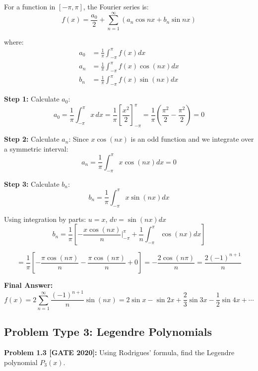 \documentclass[12pt,a4paper]{article}
\begin{document}
\begin{solution}
For a function in $[-\pi, \pi]$, the Fourier series is:
$$f(x) = \frac{a_0}{2} + \sum_{n=1}^{\infty} (a_n \cos nx + b_n \sin nx)$$

where:
\begin{align*}
a_0 &= \frac{1}{\pi}\int_{-\pi}^{\pi} f(x)dx \\
a_n &= \frac{1}{\pi}\int_{-\pi}^{\pi} f(x)\cos(nx)dx \\
b_n &= \frac{1}{\pi}\int_{-\pi}^{\pi} f(x)\sin(nx)dx
\end{align*}

\textbf{Step 1:} Calculate $a_0$:
$$a_0 = \frac{1}{\pi}\int_{-\pi}^{\pi} x\,dx = \frac{1}{\pi}\left[\frac{x^2}{2}\right]_{-\pi}^{\pi} = \frac{1}{\pi}\left(\frac{\pi^2}{2} - \frac{\pi^2}{2}\right) = 0$$

\textbf{Step 2:} Calculate $a_n$:
Since $x\cos(nx)$ is an odd function and we integrate over a symmetric interval:
$$a_n = \frac{1}{\pi}\int_{-\pi}^{\pi} x\cos(nx)dx = 0$$

\textbf{Step 3:} Calculate $b_n$:
$$b_n = \frac{1}{\pi}\int_{-\pi}^{\pi} x\sin(nx)dx$$

Using integration by parts: $u = x$, $dv = \sin(nx)dx$
$$b_n = \frac{1}{\pi}\left[-\frac{x\cos(nx)}{n}\Big|_{-\pi}^{\pi} + \frac{1}{n}\int_{-\pi}^{\pi}\cos(nx)dx\right]$$

$$= \frac{1}{\pi}\left[-\frac{\pi\cos(n\pi)}{n} - \frac{\pi\cos(n\pi)}{n} + 0\right] = -\frac{2\cos(n\pi)}{n} = \frac{2(-1)^{n+1}}{n}$$

\textbf{Final Answer:}
$$f(x) = 2\sum_{n=1}^{\infty} \frac{(-1)^{n+1}}{n}\sin(nx) = 2\sin x - \sin 2x + \frac{2}{3}\sin 3x - \frac{1}{2}\sin 4x + \cdots$$
\end{solution}

\subsection{Problem Type 3: Legendre Polynomials}

\textbf{Problem 1.3 [GATE 2020]:} Using Rodrigues' formula, find the Legendre polynomial $P_3(x)$.
\end{document}
